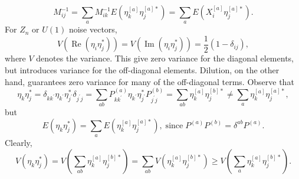\begin{equation}
    M_{i j}^{-1}=\sum_{a} M_{i k}^{-1} E\left(\eta_{k}^{[a]} \eta_{j}^{[a] *}\right)=\sum_{a} E\left(X_{i}^{[a]} \eta_{j}^{[a] *}\right).
\end{equation}
For $Z_n$ or $U(1)$ noise vectors,
\begin{equation}
    V\left(\operatorname{Re}\left(\eta_{i} \eta_{j}^{*}\right)\right)=V\left(\operatorname{Im}\left(\eta_{i} \eta_{j}^{*}\right)\right)=\frac{1}{2}\left(1-\delta_{i j}\right),
\end{equation}
where $V$ denotes the variance. This give zero variance for the diagonal elements, but introduces variance for the off-diagonal elements. Dilution, on the other hand, guarantees zero variance for many of the off-diagonal terms. Observe that
\begin{equation}
    \eta_{k} \eta_{j}^{*}=\delta_{k k^{\prime}} \eta_{k^{\prime}} \eta_{j^{\prime}}^{*} \delta_{j^{\prime} j}=\sum_{a b} P_{k k^{\prime}}^{(a)} \eta_{k^{\prime}} \eta_{j^{\prime}}^{*} P_{j^{\prime} j}^{(b)}=\sum_{a b} \eta_{k}^{[a]} \eta_{j}^{[b] *} \neq  \sum_{a} \eta_{k}^{[a]} \eta_{j}^{[a] *},
\end{equation}
but
\begin{equation}
    E\left(\eta_{k} \eta_{j}^{*}\right)=\sum_{a} E\left(\eta_{k}^{[a]} \eta_{j}^{[a] *}\right),\; \text{since}\; P^{(a)} P^{(b)}=\delta^{a b} P^{(a)}.
\end{equation}
Clearly,
\begin{equation}
    V\left(\eta_k \eta_j^*\right) = V\left(\sum_{ab}\eta_k^{[a]} \eta_j^{[b]*}\right) = \sum_{ab}V\left(\eta_k^{[a]} \eta_j^{[b]*}\right) \geq V\left(\sum_{a}\eta_k^{[a]} \eta_j^{[b]*}\right).
\end{equation}
